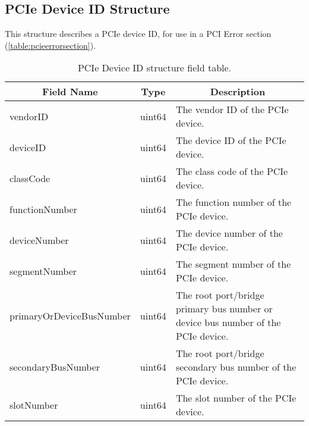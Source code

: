 \documentclass{report}
\newcommand*{\thead}[1]{\multicolumn{1}{|c|}{\bfseries #1}}
\newcommand*{\jsontable}[1]{
    \begin{table}[!ht]
    \label{#1}
    \centering
    \begin{adjustbox}{center}
    \begin{tabular}{|l|c|p{8cm}|}
    \hline
    \thead{Field Name} & \thead{Type} & \thead{Description} \\
    \hline
}
\newcommand*{\jsontableend}[1]{
    \hline
    \end{tabular}
    \end{adjustbox}
    \caption{#1}
    \label{table:#1}
    \end{table}
    \FloatBarrier
}
\begin{document}
\subsection{PCIe Device ID Structure}
\label{subsection:pciedeviceidstructure}
This structure describes a PCIe device ID, for use in a PCI Error section (\ref{table:pcieerrorsection}).
\jsontable{table:pciedeviceidstructure}
vendorID & uint64 & The vendor ID of the PCIe device.\\
\hline
deviceID & uint64 & The device ID of the PCIe device.\\
\hline
classCode & uint64 & The class code of the PCIe device.\\
\hline
functionNumber & uint64 & The function number of the PCIe device.\\
\hline
deviceNumber & uint64 & The device number of the PCIe device.\\
\hline
segmentNumber & uint64 & The segment number of the PCIe device.\\
\hline
primaryOrDeviceBusNumber & uint64 & The root port/bridge primary bus number or device bus number of the PCIe device.\\
\hline
secondaryBusNumber & uint64 & The root port/bridge secondary bus number of the PCIe device.\\
\hline
slotNumber & uint64 & The slot number of the PCIe device.\\
\jsontableend{PCIe Device ID structure field table.}

\end{document}
